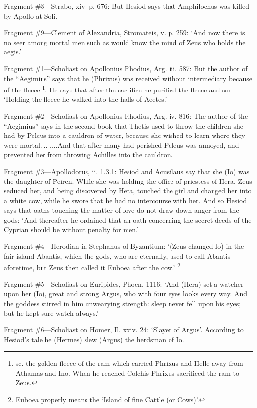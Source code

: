 Fragment \#8—Strabo, xiv. p. 676: But Hesiod says that Amphilochus was
killed by Apollo at Soli.

Fragment \#9—Clement of Alexandria, Stromateis, v. p. 259: ‘And now
there is no seer among mortal men such as would know the mind of Zeus who holds
the aegis.’


Fragment \#1—Scholiast on Apollonius Rhodius, Arg. iii. 587: But the
author of the “Aegimius” says that he (Phrixus) was received
without intermediary because of the fleece \footnote{sc. the golden fleece of
the ram which carried Phrixus and Helle away from Athamas and Ino. When he
reached Colchis Phrixus sacrificed the ram to Zeus.}. He says
that after the sacrifice he purified the fleece and so: ‘Holding the
fleece he walked into the halls of Aeetes.’

Fragment \#2—Scholiast on Apollonius Rhodius, Arg. iv. 816: The author of
the “Aegimius” says in the second book that Thetis used to throw
the children she had by Peleus into a cauldron of water, because she wished to
learn where they were mortal.... ....And that after many had perished Peleus
was annoyed, and prevented her from throwing Achilles into the cauldron.

Fragment \#3—Apollodorus, ii. 1.3.1: Hesiod and Acusilaus say that she
(Io) was the daughter of Peiren. While she was holding the office of priestess
of Hera, Zeus seduced her, and being discovered by Hera, touched the girl and
changed her into a white cow, while he swore that he had no intercourse with
her. And so Hesiod says that oaths touching the matter of love do not draw down
anger from the gods: ‘And thereafter he ordained that an oath concerning
the secret deeds of the Cyprian should be without penalty for men.’

Fragment \#4—Herodian in Stephanus of Byzantium: ‘(Zeus changed Io)
in the fair island Abantis, which the gods, who are eternally, used to call
Abantis aforetime, but Zeus then called it Euboea after the cow.’ \footnote{Euboea properly means the
‘Island of fine Cattle (or Cows)’.}

Fragment \#5—Scholiast on Euripides, Phoen. 1116: ‘And (Hera) set a
watcher upon her (Io), great and strong Argus, who with four eyes looks every
way. And the goddess stirred in him unwearying strength: sleep never fell upon
his eyes; but he kept sure watch always.’

Fragment \#6—Scholiast on Homer, Il. xxiv. 24: ‘Slayer of
Argus’. According to Hesiod’s tale he (Hermes) slew (Argus) the
herdsman of Io.

